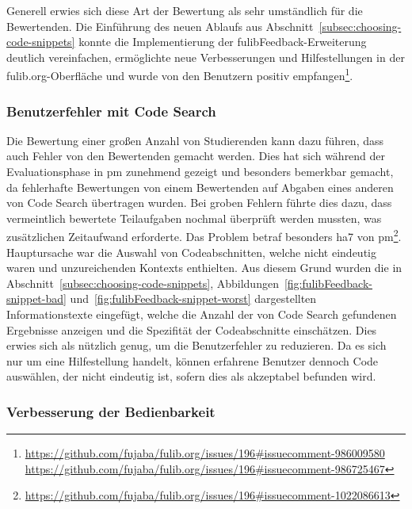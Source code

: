 Generell erwies sich diese Art der Bewertung als sehr umständlich für die Bewertenden.
Die Einführung des neuen Ablaufs aus Abschnitt~\ref{subsec:choosing-code-snippets} konnte die Implementierung der fulibFeedback-Erweiterung deutlich vereinfachen, ermöglichte neue Verbesserungen und Hilfestellungen in der fulib.org-Oberfläche und wurde von den Benutzern positiv empfangen\footnote{
    \url{https://github.com/fujaba/fulib.org/issues/196\#issuecomment-986009580}
    \url{https://github.com/fujaba/fulib.org/issues/196\#issuecomment-986725467}
}.

\subsubsection{Benutzerfehler mit Code Search}

Die Bewertung einer großen Anzahl von Studierenden kann dazu führen, dass auch Fehler von den Bewertenden gemacht werden.
Dies hat sich während der Evaluationsphase in \ac{pm} zunehmend gezeigt und besonders bemerkbar gemacht, da fehlerhafte Bewertungen von einem Bewertenden auf Abgaben eines anderen von Code Search übertragen wurden.
Bei groben Fehlern führte dies dazu, dass vermeintlich bewertete Teilaufgaben nochmal überprüft werden mussten, was zusätzlichen Zeitaufwand erforderte.
Das Problem betraf besonders \ac{ha}7 von \ac{pm}\footnote{
    \url{https://github.com/fujaba/fulib.org/issues/196\#issuecomment-1022086613}
}.
Hauptursache war die Auswahl von Codeabschnitten, welche nicht eindeutig waren und unzureichenden Kontexts enthielten.
Aus diesem Grund wurden die in Abschnitt~\ref{subsec:choosing-code-snippets}, Abbildungen~\ref{fig:fulibFeedback-snippet-bad} und~\ref{fig:fulibFeedback-snippet-worst} dargestellten Informationstexte eingefügt, welche die Anzahl der von Code Search gefundenen Ergebnisse anzeigen und die Spezifität der Codeabschnitte einschätzen.
Dies erwies sich als nützlich genug, um die Benutzerfehler zu reduzieren.
Da es sich nur um eine Hilfestellung handelt, können erfahrene Benutzer dennoch Code auswählen, der nicht eindeutig ist, sofern dies als akzeptabel befunden wird.

\subsubsection{Verbesserung der Bedienbarkeit}

